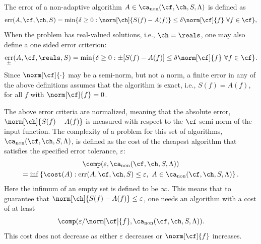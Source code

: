 \documentclass[]{elsarticle}
\DeclareMathOperator{\fix}{non}
\DeclareMathOperator{\err}{err}
\theoremstyle{definition}
\theoremstyle{remark}
\begin{document}
The error of a non-adaptive algorithm $A  \in \ca_{\fix}(\cf,\ch,S,\Lambda)$ is defined  as
\begin{equation} \label{errdefworst}
\err(A,\cf,\ch,S)
= \min\{ \delta \ge 0 : \norm[\ch]{S(f) -  A(f)} \le \delta \norm[\cf]{f} \ \forall f \in \cf \},
\end{equation}
When the problem has real-valued solutions, i.e., $\ch=\reals$, one may also define a one sided error criterion:
\begin{equation}\label{errpmdefworst}
\err_{\pm}(A,\cf,\reals,S) = 
\min \{ \delta \ge 0 : \pm[S(f) -  A(f)] \le \delta \norm[\cf]{f} \ \forall f \in \cf \}. 
\end{equation}
Since $\norm[\cf]{\cdot}$ may be a semi-norm, but not a norm, a finite error in any of the above definitions assumes that the algorithm is exact, i.e., $S(f)=A(f)$, for all $f$ with $\norm[\cf]{f}=0$.

The above error criteria are normalized, meaning that the absolute error, $\norm[\ch]{S(f) -  A(f)}$ is measured with respect to the $\cf$-semi-norm of the input function. The complexity of a problem for this set of algorithms, $\ca_{\fix}(\cf,\ch,S,\Lambda)$, is defined as the cost of the cheapest algorithm that satisfies the specified error tolerance, $\varepsilon$:
\begin{multline} \label{fixcostcomplex}
\comp(\varepsilon,\ca_{\fix}(\cf,\ch,S,\Lambda)) \\
= \inf\left\{\cost(A) : \err(A,\cf,\ch,S) \le \varepsilon, \ A \in \ca_{\fix}(\cf,\ch,S,\Lambda) \right \}.
\end{multline}
Here the infimum of an empty set is defined to be $\infty$.  This means that to guarantee that $\norm[\ch]{S(f) -  A(f)} \le \varepsilon$, one needs an algorithm with a cost of at least 
\[
\comp(\varepsilon/\norm[\cf]{f},\ca_{\fix}(\cf,\ch,S,\Lambda)).
\]
This cost does not decrease as either $\varepsilon$ decreases or $\norm[\cf]{f}$ increases.
\end{document}

